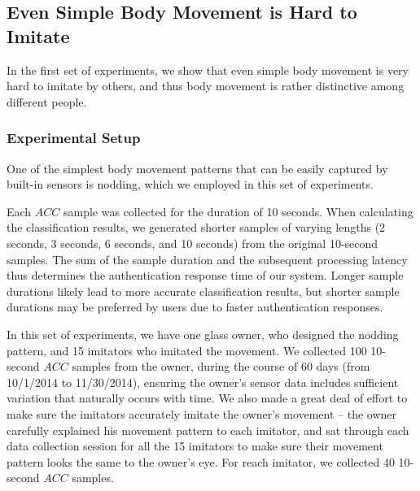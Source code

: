 \iffalse
\subsection{Even Simple Body Movement is Hard to 
Imitate}\label{sec:experimenr2}
In the first set of experiments, we show that even simple body movement is 
very hard to imitate by others, and thus body movement is rather distinctive 
among different people.

\subsubsection{Experimental Setup}
One of the simplest body movement patterns that can be easily captured by 
built-in sensors is nodding, which we employed in this set of experiments.

Each $ACC$ sample was collected for the duration of 10 seconds. When 
calculating the classification results, we generated shorter samples of 
varying lengths (2 seconds, 3 seconds, 6 seconds, and 10 seconds) from the 
original 10-second samples. The sum of the sample duration and the subsequent 
processing latency thus determines the authentication response time of our 
system. Longer sample durations likely lead to more accurate classification 
results, but shorter sample durations may be preferred by users due to faster 
authentication responses.

In this set of experiments, we have one glass owner, who designed the nodding 
pattern,  and 15 imitators who imitated the movement. We collected 100 
10-second $ACC$ samples from the owner, during the course of 60 days (from 
10/1/2014 to 11/30/2014), ensuring the owner's sensor data includes sufficient 
variation that naturally occurs with time. We also made a great deal of effort 
to make sure the imitators accurately imitate the owner's movement -- the 
owner carefully explained his movement pattern to each imitator, and sat 
through each data collection session for all the 15 imitators to make sure 
their movement pattern looks the same to the owner's eye. For reach imitator, 
we collected 40 10-second $ACC$ samples.

